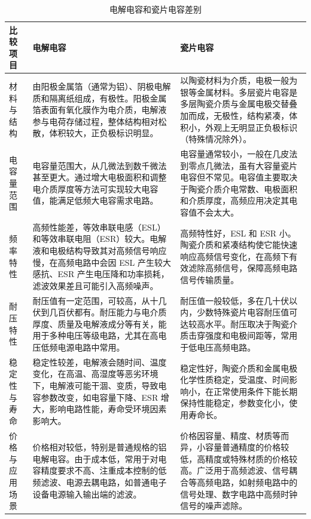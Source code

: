 \documentclass[./测控三级项目.tex]{subfiles} %
\begin{document}
	\begin{table}[h!]
		\centering
		\caption{电解电容和瓷片电容差别}
		\label{tab:电解电容和瓷片电容差别}
		\begin{tabular}{|p{2cm}|p{7cm}|p{7cm}|}
			\hline
			比较项目 & 电解电容  & 瓷片电容 \\
			\hline
			材料与结构 & 由阳极金属箔（通常为铝）、阴极电解质和隔离纸组成，有极性。阳极金属箔表面有氧化膜作为电介质，电解液参与电荷存储过程，整体结构相对松散，体积较大，正负极标识明显。 & 以陶瓷材料为介质，电极一般为银等金属材料。多层瓷片电容是多层陶瓷介质与金属电极交替叠加而成，无极性，结构紧凑，体积小，外观上无明显正负极标识（特殊情况除外）。 \\
			\hline
			电容量范围 & 电容量范围大，从几微法到数千微法甚至更大。通过增大电极面积和调整电介质厚度等方法可实现较大电容值，能满足低频大电容需求电路。 & 电容量通常较小，一般在几皮法到零点几微法，虽有大容量瓷片电容但不常见。电容值主要取决于陶瓷介质介电常数、电极面积和介质厚度，高频应用决定其电容值不会太大。 \\
			\hline
			频率特性 & 高频性能差，等效串联电感（ESL）和等效串联电阻（ESR）较大。电解液和电极结构导致其对高频信号响应慢，在高频电路中会因 ESL 产生较大感抗、ESR 产生电压降和功率损耗，滤波效果差且可能引入高频噪声。 & 高频特性好，ESL 和 ESR 小。陶瓷介质和紧凑结构使它能快速响应高频信号变化，在高频下有效滤除高频信号，保障高频电路信号传输质量。 \\
			\hline
			耐压特性 & 耐压值有一定范围，可较高，从十几伏到几百伏都有。耐压能力与电介质厚度、质量及电解液成分等有关，能用于多种电压等级电路，尤其在高电压低频电源电路中常用。& 耐压值一般较低，多在几十伏以内，少数特殊瓷片电容耐压值可达较高水平。耐压取决于陶瓷介质击穿强度和电极间距等，常用于低电压高频电路。 \\
			\hline
			稳定性与寿命&	稳定性较差，电解液会随时间、温度变化，在高温、高湿度等恶劣环境下，电解液可能干涸、变质，导致电容参数改变，如电容量下降、ESR 增大，影响电路性能，寿命受环境因素影响大。&	稳定性好，陶瓷介质和金属电极化学性质稳定，受温度、时间影响小，在正常使用条件下能长期保持性能稳定，参数变化小，使用寿命长。\\
			\hline
			价格与应用场景&	价格相对较低，特别是普通规格的铝电解电容。由于成本低，常用于对电容精度要求不高、注重成本控制的低频滤波、电源去耦电路，如普通电子设备电源输入输出端的滤波。&	价格因容量、精度、材质等而异，小容量普通精度的价格较低，高精度或特殊材质的价格较高。广泛用于高频滤波、信号耦合等高频电路，如射频电路中的信号处理、数字电路中高频时钟信号的噪声滤除。 \\
			\hline
		\end{tabular}
	\end{table}	\par
\end{document}
